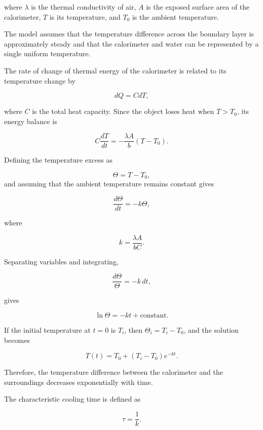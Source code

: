 \documentclass[12pt,a4paper]{article}
\begin{document}
where $\lambda$ is the thermal conductivity of air, $A$ is the
exposed surface area of the calorimeter, $T$ is its temperature,
and $T_0$ is the ambient temperature.

The model assumes that the temperature difference across the
boundary layer is approximately steady and that the calorimeter
and water can be represented by a single uniform temperature.

The rate of change of thermal energy of the calorimeter is related
to its temperature change by

\[
dQ = CdT,
\]

where $C$ is the total heat capacity. Since the object loses heat
when $T>T_0$, its energy balance is

\begin{equation}
    C\frac{dT}{dt}
    =-\frac{\lambda A}{b}(T-T_0).
    \label{eq:energybalance}
\end{equation}

Defining the temperature excess as

\[
\Theta=T-T_0,
\]
and assuming that the ambient temperature remains constant gives

\begin{equation}
    \frac{d\Theta}{dt}=-k\Theta,
    \label{eq:coolingode}
\end{equation}

where

\begin{equation}
    k=\frac{\lambda A}{bC}.
    \label{eq:kdef}
\end{equation}

Separating variables and integrating,

\[
\frac{d\Theta}{\Theta}=-k\,dt,
\]

gives

\[
\ln\Theta=-kt+\text{constant}.
\]
    
If the initial temperature at $t=0$ is $T_i$, then
$\Theta_i=T_i-T_0$, and the solution becomes

\begin{equation}
    \boxed{
    T(t)=T_0+(T_i-T_0)e^{-kt}
    }.
    \label{eq:newton}
\end{equation}

Therefore, the temperature difference between the calorimeter
and the surroundings decreases exponentially with time.

The characteristic cooling time is defined as

\[
\boxed{\tau=\frac{1}{k}}.
\]
\end{document}
